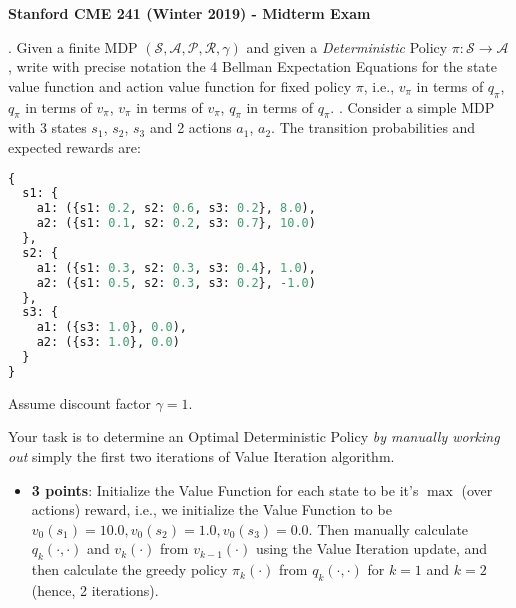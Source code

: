 \documentclass[12pt]{exam}
\begin{document}
\begin{center}
{\large {\bf Stanford CME 241 (Winter 2019) - Midterm Exam}}
\end{center}
\vspace{5mm}
 
\begin{questions}
.  Given a finite MDP $(\mathcal{S}, \mathcal{A}, \mathcal{P}, \mathcal{R}, \gamma)$ and given a {\em Deterministic} Policy $\pi: \mathcal{S} \rightarrow \mathcal{A}$,  write with precise notation the 4 Bellman Expectation Equations for the state value function and action value function for fixed policy $\pi$, i.e., $v_{\pi}$ in terms of $q_{\pi}$, $q_{\pi}$ in terms of $v_{\pi}$, $v_{\pi}$ in terms of $v_{\pi}$, $q_{\pi}$ in terms of $q_{\pi}$.
\vspace{3mm}
. Consider a simple MDP with 3 states $s_1$, $s_2$, $s_3$ and 2 actions $a_1$, $a_2$. The transition probabilities and expected rewards are:
\begin{lstlisting}[language=python]
{
  s1: {
    a1: ({s1: 0.2, s2: 0.6, s3: 0.2}, 8.0),
    a2: ({s1: 0.1, s2: 0.2, s3: 0.7}, 10.0)
  },
  s2: {
    a1: ({s1: 0.3, s2: 0.3, s3: 0.4}, 1.0),
    a2: ({s1: 0.5, s2: 0.3, s3: 0.2}, -1.0)
  },
  s3: {
    a1: ({s3: 1.0}, 0.0),
    a2: ({s3: 1.0}, 0.0)
  }
}
\end{lstlisting}
Assume discount factor $\gamma = 1$.

Your task is to determine an Optimal Deterministic Policy {\em by manually working out} simply the first two iterations of Value Iteration algorithm. 

\begin{itemize}
\item {\bf 3 points}: Initialize the Value Function for each state to be it's $\max$ (over actions) reward, i.e., we initialize the Value Function to be $v_0(s_1) = 10.0, v_0(s_2) = 1.0, v_0(s_3) = 0.0$. Then manually calculate $q_k(\cdot, \cdot)$ and $v_k(\cdot)$ from $v_{k - 1}( \cdot)$ using the Value Iteration update, and then calculate the greedy policy $\pi_k(\cdot)$ from $q_k(\cdot, \cdot)$ for $k = 1$ and $k = 2$ (hence, 2 iterations).


\end{itemize}
\end{questions}
\end{document}
